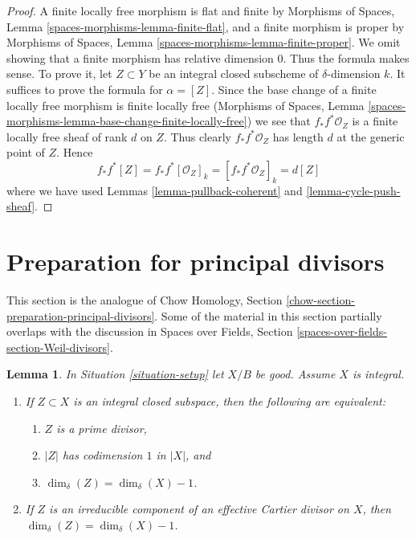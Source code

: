 \documentclass{stacks-project}
\theoremstyle{plain}
\newtheorem{lemma}[subsection]{Lemma}
\theoremstyle{definition}
\theoremstyle{remark}
\numberwithin{equation}{subsection}
\begin{document}
\begin{proof}
A finite locally free morphism is flat and finite by
Morphisms of Spaces, Lemma \ref{spaces-morphisms-lemma-finite-flat},
and a finite morphism is proper
by Morphisms of Spaces, Lemma \ref{spaces-morphisms-lemma-finite-proper}.
We omit showing that a finite
morphism has relative dimension $0$. Thus the formula makes sense.
To prove it, let $Z \subset Y$ be an integral closed subscheme
of $\delta$-dimension $k$. It suffices to prove the formula
for $\alpha = [Z]$. Since the base change of a finite locally free
morphism is finite locally free
(Morphisms of Spaces, Lemma
\ref{spaces-morphisms-lemma-base-change-finite-locally-free})
we see that $f_*f^*\mathcal{O}_Z$ is a finite locally free sheaf of
rank $d$ on $Z$. Thus clearly $f_*f^*\mathcal{O}_Z$ has length $d$
at the generic point of $Z$. Hence
$$
f_*f^*[Z] = f_*f^*[\mathcal{O}_Z]_k =
[f_*f^*\mathcal{O}_Z]_k = d[Z]
$$
where we have used Lemmas \ref{lemma-pullback-coherent} and
\ref{lemma-cycle-push-sheaf}.
\end{proof}










\section{Preparation for principal divisors}
\label{section-preparation-principal-divisors}

\noindent
This section is the analogue of
Chow Homology, Section \ref{chow-section-preparation-principal-divisors}.
Some of the material in this section partially overlaps with the
discussion in Spaces over Fields, Section
\ref{spaces-over-fields-section-Weil-divisors}.

\begin{lemma}
\label{lemma-divisor-delta-dimension}
In Situation \ref{situation-setup} let $X/B$ be good. Assume $X$ is
integral.
\begin{enumerate}
\item If $Z \subset X$ is an integral closed subspace, then
the following are equivalent:
\begin{enumerate}
\item $Z$ is a prime divisor,
\item $|Z|$ has codimension $1$ in $|X|$, and
\item $\dim_\delta(Z) = \dim_\delta(X) - 1$.
\end{enumerate}
\item If $Z$ is an irreducible component of an effective Cartier
divisor on $X$, then $\dim_\delta(Z) = \dim_\delta(X) - 1$.
\end{enumerate}
\end{lemma}
\end{document}
